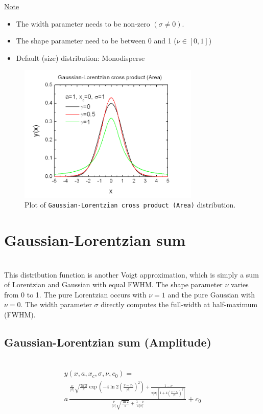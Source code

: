 \uline{Note}
\begin{itemize}
  \item The width parameter needs to be non-zero $(\sigma\neq 0)$.
  \item The shape parameter need to be between 0 and 1 ($\nu\in [0,1]$)
  \item Default (size) distribution: Monodisperse
\end{itemize}
\begin{figure}[htb]
\begin{center}
\includegraphics[width=0.768\textwidth]{GaussianLorentzianCrossProductArea.png}
\end{center}
\caption{Plot of \texttt{Gaussian-Lorentzian cross product (Area)} distribution.}
\label{fig:GaussianLorentzianCrossProductArea}
\end{figure}
\clearpage

\section{Gaussian-Lorentzian sum} ~\\
\label{sec:GaussianLorentzianSum}
This distribution function is another Voigt approximation, which is simply a sum of
Lorentzian and Gaussian with equal FWHM. The shape parameter $\nu$ varies from 0 to 1. The pure
Lorentzian occurs with $\nu=1$ and the pure Gaussian with $\nu=0$. The width parameter $\sigma$
directly computes the full-width at half-maximum (FWHM).

\vspace{5mm} \clearpage

\subsection{Gaussian-Lorentzian sum (Amplitude)} ~\\
\label{sec:GaussianLorentzianSumAmplitude}
\begin{multline}
y(x,a,x_c,\sigma,\nu,c_0) = \\
a\,\frac{\frac{\nu}{|\sigma|}\sqrt{\frac{\ln 2}{\pi}}\exp\left(-4\ln
2\left(\frac{x-x_c}{|\sigma|}\right)^2\right)+\frac{1-\nu}{\pi|\sigma|\left[1+4\left(\frac{x-x_c}{|\sigma|}\right)^2\right]}}{\frac{\nu}{|\sigma|}\sqrt{\frac{\ln
2}{\pi}}+\frac{1-\nu}{\pi|\sigma|}} + c_0
\end{multline}

